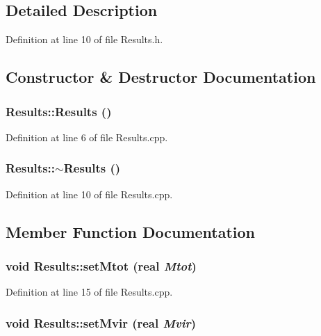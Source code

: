 \subsection{Detailed Description}


Definition at line 10 of file Results.h.

\subsection{Constructor \& Destructor Documentation}
\hypertarget{classResults_e15a9e843b67c54e98a6f59a56104e1f}{
\subsubsection[Results]{\setlength{\rightskip}{0pt plus 5cm}Results::Results ()}}
\label{classResults_e15a9e843b67c54e98a6f59a56104e1f}




Definition at line 6 of file Results.cpp.\hypertarget{classResults_0547c32c2061192a72cad9db694ffb16}{
\subsubsection[$\sim$Results]{\setlength{\rightskip}{0pt plus 5cm}Results::$\sim$Results ()}}
\label{classResults_0547c32c2061192a72cad9db694ffb16}




Definition at line 10 of file Results.cpp.

\subsection{Member Function Documentation}
\hypertarget{classResults_aa642ad38f7cf840df56a5a270776272}{
\subsubsection[setMtot]{\setlength{\rightskip}{0pt plus 5cm}void Results::setMtot ({\bf real} {\em Mtot})}}
\label{classResults_aa642ad38f7cf840df56a5a270776272}




Definition at line 15 of file Results.cpp.\hypertarget{classResults_ff53f5aede365e0602c67eb6cab157be}{
\subsubsection[setMvir]{\setlength{\rightskip}{0pt plus 5cm}void Results::setMvir ({\bf real} {\em Mvir})}}
\label{classResults_ff53f5aede365e0602c67eb6cab157be}




